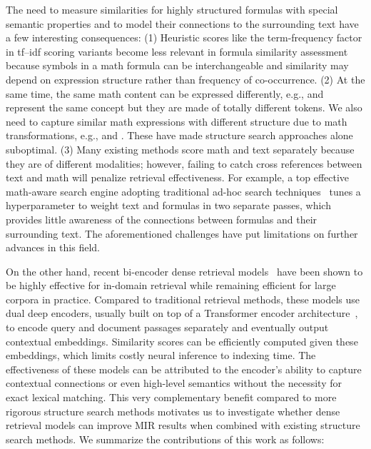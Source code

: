 \documentclass[11pt]{article}
\begin{document}
The need to measure similarities for highly structured formulas with special semantic properties and to model their connections to the surrounding text have a few interesting consequences:
(1) Heuristic scores like the term-frequency factor in tf--idf scoring variants become less relevant in formula similarity assessment because symbols in a math formula can be interchangeable and similarity may depend on expression structure rather than frequency of co-occurrence. 
(2) At the same time, the same math content can be expressed differently, e.g.,  and  represent the same concept but they are made of totally different tokens. 
We also need to capture similar math expressions with different structure due to math transformations, e.g.,  and . 
These have made structure search approaches alone suboptimal.
(3) Many existing methods score math and text separately because they are of different modalities; however, failing to catch cross references between text and math will penalize retrieval effectiveness.
For example, a top effective math-aware search engine adopting traditional ad-hoc search techniques~\cite{fraser2018tangentL,ng2020dowsing, ng2021dowsing} tunes a hyperparameter to weight text and formulas in two separate passes, which provides little awareness of the connections between formulas and their surrounding text.
The aforementioned challenges have put limitations on further advances in this field.

On the other hand, recent bi-encoder dense retrieval models~\cite{karpukhin2020dpr,santhanam2021colbertv2,hofstatter2021TAS_B,formal2021spladeV2,gao2021condenser} have been shown to be highly effective for in-domain retrieval while remaining efficient for large corpora in practice.
Compared to traditional retrieval methods, these models use dual deep encoders, usually built on top of a Transformer encoder architecture~\cite{vaswani2017attention,devlin2019bert}, to encode query and document passages separately and eventually output contextual embeddings.
Similarity scores can be efficiently computed given these embeddings, which limits costly neural inference to indexing time.
The effectiveness of these models can be attributed to the encoder's ability to capture contextual connections or even high-level semantics without the necessity for exact lexical matching.
This very complementary benefit compared to more rigorous structure search methods motivates us to investigate whether dense retrieval models can improve MIR results when combined with existing structure search methods.
We summarize the contributions of this work as follows:
\end{document}
